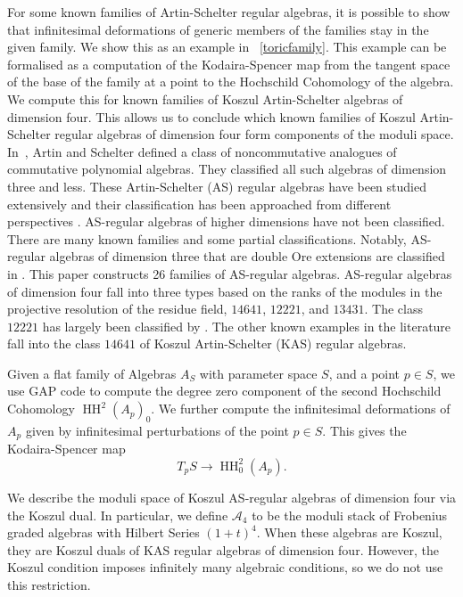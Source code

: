 \documentclass{amsart}
\def\HH{\operatorname{HH}}
\begin{document}
For some known families of Artin-Schelter regular algebras, it is possible to show that infinitesimal deformations of generic members of the families stay in the given family.  We show this as an example in ~\ref{toricfamily}.  This example can be formalised as a computation of the Kodaira-Spencer map from the tangent space of the base of the family at a point to the Hochschild Cohomology of the algebra.  We compute this for known families of Koszul Artin-Schelter algebras of dimension four.  This allows us to conclude which known families of Koszul Artin-Schelter regular algebras of dimension four form components of the moduli space.  
In~\cite{ARTIN1987171}, Artin and Schelter defined a class of noncommutative analogues of commutative polynomial algebras. They classified all such algebras of dimension three and less.  These Artin-Schelter (AS) regular algebras have been studied extensively \cite{rogalski2023artinschelter} and their classification has been approached from different perspectives \cite{Okawa,Artin2007SomeAA, MR1128218,BondalPolischuk}.  AS-regular algebras of higher dimensions have not been classified.  
There are many known families and some partial classifications.  Notably, AS-regular algebras of dimension three that are double Ore extensions are classified in \cite{MR2529094}. This paper constructs 26 families of AS-regular algebras. AS-regular algebras of dimension four fall into three types based on the ranks of the modules in the projective resolution of the residue field, $\textit{14641}$, $\textit{12221}$, and $\textit{13431}.$ The class $\textit{12221}$ has largely been classified by \cite{Lu_2007}.  The other known examples in the literature fall into the class $\textit{14641}$ of Koszul Artin-Schelter (KAS) regular algebras.

Given a flat family of Algebras $A_S$ with parameter space $S$, and a point $p\in S$, we use GAP code to compute the degree zero component of the second Hochschild Cohomology $\HH^2(A_p)_0$.  We further compute the infinitesimal deformations of $A_p$ given by infinitesimal perturbations of the point $p \in S$.  This gives the Kodaira-Spencer map
$$T_pS \to \HH^2_0(A_p).$$

We describe the moduli space of Koszul AS-regular algebras of dimension four via the Koszul dual.  In particular, we define $\mathcal{A}_4$ to be the moduli stack of Frobenius graded algebras with Hilbert Series $(1+t)^4$.  When these algebras are Koszul, they are Koszul duals of KAS regular algebras of dimension four.  However, the Koszul condition imposes infinitely many algebraic conditions, so we do not use this restriction.
\end{document}
